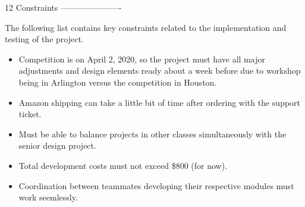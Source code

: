 12 Constraints
----------------------

The following list contains key constraints related to the implementation and testing of the project.



\begin{itemize}
	\item Competition is on April 2, 2020, so the project must have all major adjustments and design elements ready about a week before due to workshop being in Arlington versus the competition in Houston.
	\item Amazon shipping can take a little bit of time after ordering with the support ticket. 
	\item Must be able to balance projects in other classes simultaneously with the senior design project.
	\item Total development costs must not exceed \$800 (for now).
	\item Coordination between teammates developing their respective modules must work seemlessly.
\end{itemize}